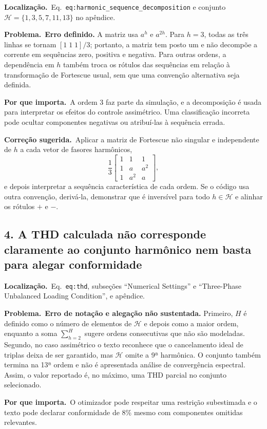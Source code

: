 \documentclass[11pt,a4paper]{article}
\newcommand{\localizacao}{\textbf{Localização.}\ }
\newcommand{\problema}{\textbf{Problema.}\ }
\newcommand{\impacto}{\textbf{Por que importa.}\ }
\newcommand{\correcao}{\textbf{Correção sugerida.}\ }
\begin{document}
\localizacao Eq.~\texttt{eq:harmonic\_sequence\_decomposition} e conjunto
$\mathcal H=\{1,3,5,7,11,13\}$ no apêndice.

\problema \textbf{Erro definido.} A matriz usa $a^h$ e $a^{2h}$. Para
$h=3$, todas as três linhas se tornam $[1\;1\;1]/3$; portanto, a matriz tem
posto um e não decompõe a corrente em sequências zero, positiva e negativa.
Para outras ordens, a dependência em $h$ também troca os rótulos das sequências
em relação à transformação de Fortescue usual, sem que uma convenção
alternativa seja definida.

\impacto A ordem 3 faz parte da simulação, e a decomposição é usada para
interpretar os efeitos do controle assimétrico. Uma classificação incorreta
pode ocultar componentes negativas ou atribuí-las à sequência errada.

\correcao Aplicar a matriz de Fortescue não singular e independente de $h$ a
cada vetor de fasores harmônicos,
\[
 \frac{1}{3}
 \begin{bmatrix}1&1&1\\1&a&a^2\\1&a^2&a\end{bmatrix},
\]
e depois interpretar a sequência característica de cada ordem. Se o código
usa outra convenção, derivá-la, demonstrar que é inversível para todo
$h\in\mathcal H$ e alinhar os rótulos $+$ e $-$.

\subsection*{4. A THD calculada não corresponde claramente ao conjunto harmônico nem basta para alegar conformidade}

\localizacao Eq.~\texttt{eq:thd}, subseções ``Numerical Settings'' e
``Three-Phase Unbalanced Loading Condition'', e apêndice.

\problema \textbf{Erro de notação e alegação não sustentada.} Primeiro, $H$
é definido como o número de elementos de $\mathcal H$ e depois como a maior
ordem, enquanto a soma $\sum_{h=2}^{H}$ sugere ordens consecutivas que não são
modeladas. Segundo, no caso assimétrico o texto reconhece que o cancelamento
ideal de triplas deixa de ser garantido, mas $\mathcal H$ omite a 9ª harmônica.
O conjunto também termina na 13ª ordem e não é apresentada análise de
convergência espectral. Assim, o valor reportado é, no máximo, uma THD parcial
no conjunto selecionado.

\impacto O otimizador pode respeitar uma restrição subestimada e o texto pode
declarar conformidade de 8\% mesmo com componentes omitidas relevantes.
\end{document}
